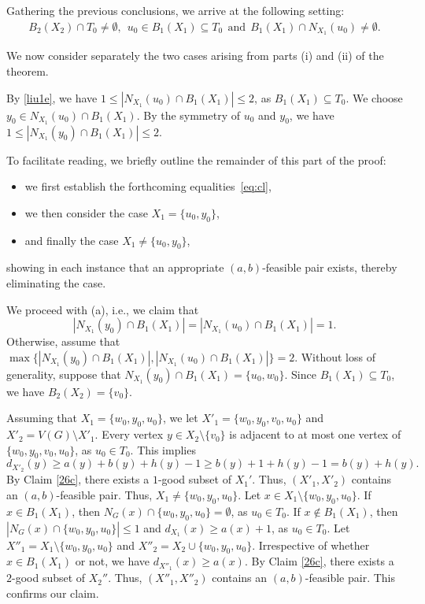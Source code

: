 \documentclass[11p]{elsarticle}
\theoremstyle{definition}
\begin{document}
Gathering the previous conclusions, we arrive at the following setting: \begin{align}\label{liu1e}B_2(X_2)\cap T_0\ne \emptyset,~~u_0\in B_1(X_1)\subseteq T_0 ~~\text{and}  ~~B_1(X_1)\cap N_{X_1}(u_0)\ne \emptyset.\end{align}

We now consider separately the two cases arising from parts (i) and (ii) of the theorem.


\medskip{}

By \eqref{liu1e}, we have   $1\le  \left| N_{X_1}(u_0)\cap B_1(X_1)\right|\le 2$, as $B_1(X_1)\subseteq T_0$. We choose $y_0\in N_{X_1}(u_0)\cap B_1(X_1)$.  By the symmetry of $u_0$ and $y_0$, we have $1\le  \left| N_{X_1}(y_0)\cap B_1(X_1)\right|\le 2$.

To facilitate reading, we briefly outline the remainder of this part of the proof:
\begin{itemize}
	\item[(a)] we first establish  the forthcoming equalities~\eqref{eq:cl},
	\item[(b)] we then consider the case $X_1 = \{u_0, y_0\}$,
	\item[(c)] and finally the case $X_1 \neq \{u_0, y_0\}$,
\end{itemize}
showing in each instance that an appropriate $(a,b)$-feasible pair exists, thereby eliminating the case.



We proceed with (a), i.e., we claim that  \begin{equation}\label{eq:cl}|N_{X_1}(y_0)\cap B_1(X_1)|=|N_{X_1}(u_0)\cap B_1(X_1)|=1.\end{equation} Otherwise, assume that   $\max\{|N_{X_1}(y_0)\cap B_1(X_1)|, |N_{X_1}(u_0)\cap B_1(X_1)|\}= 2$. Without loss of generality, suppose that   $ N_{X_1}(y_0)\cap B_1(X_1)=\{u_0,w_0\} $. Since $B_1(X_1)\subseteq T_0$, we have   $B_2(X_2)=\{v_0\}$.

Assuming that $X_1=\{w_0,y_0,u_0\}$, we let $X'_1=\{w_0,y_0,v_0,u_0\}$ and $X'_2=V(G)\setminus X'_1$.  Every vertex $y\in X_2\setminus \{v_0\}$ is adjacent to at most one vertex of $\{w_0,y_0,v_0,u_0\}$, as $u_0\in T_0$. This implies $$d_{X'_2}(y)\ge a(y)+b(y)+h(y)-1\ge b(y)+1+h(y)-1=b(y)+h(y).$$ By Claim \ref{26c}, there {exists} a $ 1 $-good subset of $ X_1' $. Thus, {$(X'_1, X'_2)$ contains an $  (a, b) $-feasible pair}. Thus, $X_1\ne \{w_0,y_0,u_0\}$. Let $x\in X_1\setminus \{w_0,y_0,u_0\}$. If $x\in B_1(X_1)$, then $N_G(x)\cap \{w_0,y_0,u_0\}=\emptyset$, as $u_0\in T_0$.
If $x\not\in B_1(X_1)$, then $|N_G(x)\cap \{w_0,y_0,u_0\}|\le 1$ and $d_{X_1}(x)\ge a(x)+1$, as $u_0\in T_0$. Let $X''_1=X_1\setminus \{w_0,y_0,u_0\}$ and $X''_2=X_2\cup \{w_0,y_0,u_0\}$. Irrespective of whether $x\in B_1(X_1)$ or not, we have $d_{X''_1}(x)\ge a(x)$. By Claim \ref{26c}, there {exists} a $ 2 $-good subset of $ X_2'' $. Thus, {$(X''_1, X''_2)$ contains  an $(a, b) $-feasible pair}. This confirms our claim.
\end{document}
